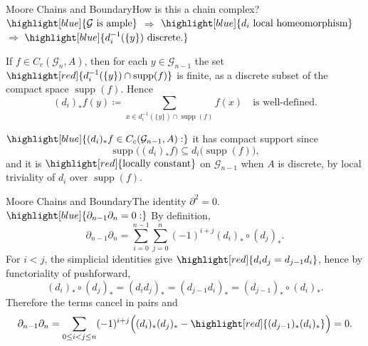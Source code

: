 \documentclass[aspectratio=169]{beamer}
\newcommand{\G}{\mathcal{G}}
\newcommand{\supp}{\operatorname{supp}}
\begin{document}

\begin{frame}{Moore Chains and Boundary}{How is this a chain complex?}
  $\highlight[blue]{\text{\(\G\) is ample}}$
  $\Rightarrow$
  $\highlight[blue]{\text{\(d_i\) local homeomorphism}}$
  $\Rightarrow$
  $\highlight[blue]{\text{\(d_i^{-1}(\{y\})\) discrete.}}$
  \vspace{0.2cm}
  \pause

  If \(f\in C_c(\G_n,A)\), then for each \(y\in \G_{n-1}\) the set
  \(\highlight[red]{d_i^{-1}(\{y\})\cap \supp(f)}\) is finite, as a discrete subset of the compact space \(\supp(f)\).
  Hence
  \[
    (d_i)_*f(y)\coloneqq \sum_{x\in d_i^{-1}(\{y\})\cap \supp(f)} f(x)
    \quad \text{is well-defined.}
  \]
  \pause

  \(\highlight[blue]{(d_i)_*f\in C_c(\G_{n-1},A):}\)
  it has compact support since
  \[
    \supp\bigl((d_i)_*f\bigr)\subseteq d_i\bigl(\supp(f)\bigr),
  \]
  and it is \(\highlight[red]{\text{locally constant}}\) on \(\G_{n-1}\) when \(A\) is discrete, by local triviality of \(d_i\) over \(\supp(f)\).
\end{frame}

\begin{frame}{Moore Chains and Boundary}{The identity \(\partial^2=0\).}
  \(\highlight[blue]{\partial_{n-1}\partial_n=0:}\)
  By definition,
  \[
    \partial_{n-1}\partial_n
    =\sum_{i=0}^{n-1}\sum_{j=0}^{n}(-1)^{i+j}(d_i)_*\circ(d_j)_*.
  \]
  For \(i<j\), the simplicial identities give \(\highlight[red]{d_i d_j=d_{j-1}d_i}\), hence by functoriality of pushforward,
  \[
    (d_i)_*\circ(d_j)_*=(d_i d_j)_*=(d_{j-1}d_i)_*=(d_{j-1})_*\circ(d_i)_*.
  \]
  Therefore the terms cancel in pairs and
  \[
    \partial_{n-1}\partial_n
    =\sum_{0\le i<j\le n}(-1)^{i+j}\Bigl((d_i)_*(d_j)_*-\highlight[red]{(d_{j-1})_*(d_i)_*}\Bigr)=0.
  \]
\end{frame}
\end{document}
